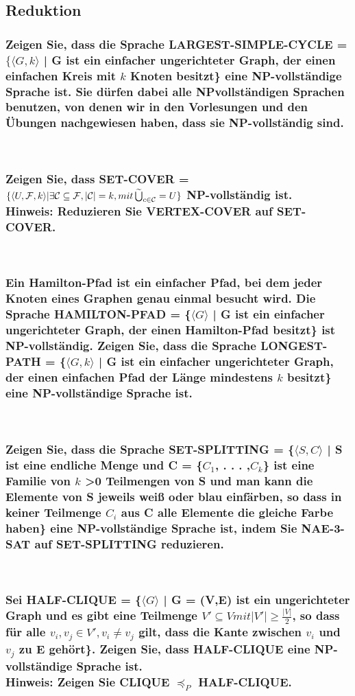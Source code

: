 \documentclass[a4paper,12pt]{article}
\newcommand{\wbigcup}{\mathop{\widetilde{\bigcup}}\displaylimits}
\begin{document}
	\subsection{Reduktion}
	
	\subsubsection{Zeigen Sie, dass die Sprache LARGEST-SIMPLE-CYCLE = $\{\langle G,k\rangle$ | G ist ein einfacher ungerichteter Graph, der einen einfachen Kreis mit $k$ Knoten besitzt\} eine NP-vollst\"andige Sprache ist. Sie d\"urfen dabei alle NPvollst\"andigen Sprachen benutzen, von denen wir in den Vorlesungen und den \"Ubungen nachgewiesen haben,	dass sie NP-vollst\"andig sind.}
	~
	\subsubsection{Zeigen Sie, dass SET-COVER = $\{\langle U,\mathcal{F},k\rangle | \exists \mathcal{C} \subseteq \mathcal{F}, |\mathcal{C}| = k, mit \wbigcup_{c \in \mathcal{C}} = U\}$ NP-vollst\"andig ist.\\ Hinweis: Reduzieren Sie VERTEX-COVER auf SET-COVER.}
	~
	\subsubsection{Ein Hamilton-Pfad ist ein einfacher Pfad, bei dem jeder Knoten eines Graphen genau einmal besucht wird. Die Sprache HAMILTON-PFAD = \{$\langle G\rangle$ | G ist ein einfacher ungerichteter Graph, der einen Hamilton-Pfad besitzt\} ist NP-vollst\"andig. Zeigen Sie, dass die Sprache LONGEST-PATH = \{$\langle G,k\rangle$ | G ist ein einfacher ungerichteter Graph, der einen einfachen Pfad der L\"ange mindestens $k$ besitzt\} eine NP-vollst\"andige Sprache ist.}
	~
	\subsubsection{Zeigen Sie, dass die Sprache SET-SPLITTING = \{$\langle S,C\rangle$ | S ist eine endliche Menge und C = \{$C_1$, . . . ,$C_k$\} ist	eine Familie von $k$ \textgreater 0 Teilmengen von S und man kann die Elemente von S jeweils weiß oder blau einf\"arben, so dass in keiner Teilmenge $C_i$ aus C alle Elemente die gleiche Farbe haben\} eine NP-vollst\"andige Sprache ist, indem Sie NAE-3-SAT auf SET-SPLITTING reduzieren.}
	~
	\subsubsection{Sei HALF-CLIQUE = \{$\langle G\rangle$ | G = (V,E) ist ein ungerichteter Graph und es gibt eine Teilmenge $V' \subseteq V mit |V'| \geq \frac{|V|}{2} $, so dass f\"ur alle $v_i , v_j \in V', v_i \not= v_j $ gilt, dass die Kante zwischen $v_i$ und $v_j$ zu E geh\"ort\}. Zeigen Sie, dass HALF-CLIQUE eine NP-vollst\"andige Sprache ist.\\ Hinweis: Zeigen Sie CLIQUE $\preceq_P$ HALF-CLIQUE.}
	~
\end{document}
